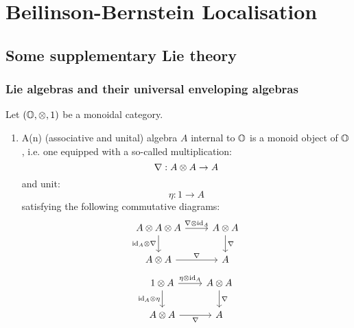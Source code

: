 \section{Beilinson-Bernstein Localisation}
    \subsection{Some supplementary Lie theory}
        \subsubsection{Lie algebras and their universal enveloping algebras}
            \begin{definition} \label{def: algebras_and_coalgebras}
                Let $(\O, \tensor, 1)$ be a monoidal category. 
                    \begin{enumerate}
                        \item A(n) (associative and unital) algebra $A$ internal to $\O$ is a monoid object of $\O$, i.e. one equipped with a so-called multiplication:
                            $$\nabla: A \tensor A \to A$$
                        and unit:
                            $$\eta: 1 \to A$$
                        satisfying the following commutative diagrams:
                            $$
                                \begin{tikzcd}
                                	{A \tensor A \tensor A} & {A \tensor A} \\
                                	{A \tensor A} & {A}
                                	\arrow["{\id_A \tensor \nabla}"', from=1-1, to=2-1]
                                	\arrow["{\nabla}", from=2-1, to=2-2]
                                	\arrow["{\nabla \tensor \id_A}", from=1-1, to=1-2]
                                	\arrow["{\nabla}", from=1-2, to=2-2]
                                \end{tikzcd}
                            $$
                            $$
                                \begin{tikzcd}
                                	{1 \tensor A} & {A \tensor A} \\
                                	{A \tensor A} & {A}
                                	\arrow["{\nabla}", from=1-2, to=2-2]
                                	\arrow["{\nabla}"', from=2-1, to=2-2]
                                	\arrow["{\id_A \tensor \eta}"', from=1-1, to=2-1]
                                	\arrow["{\eta \tensor \id_A}", from=1-1, to=1-2]

\end{tikzcd}$$
\end{enumerate}
\end{definition}
